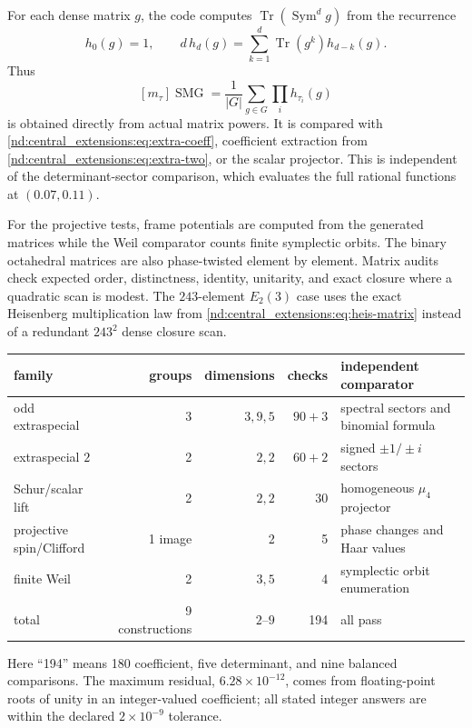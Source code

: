 \documentclass[10pt]{article}
\newcommand{\Sym}{\operatorname{Sym}}
\newcommand{\Tr}{\operatorname{Tr}}
\newcommand{\SMG}{\operatorname{SMG}}
\newcommand{\MGF}{\SMG}
\begin{document}
For each dense matrix $g$, the code computes
$\Tr(\Sym^d g)$ from the recurrence
\begin{equation}\label{nd:central_extensions:eq:newton}
 h_0(g)=1,\qquad
 d\,h_d(g)=\sum_{k=1}^{d}\Tr(g^k)h_{d-k}(g).
\end{equation}
Thus
\[
 [m_\tau]\MGF=\frac1{|G|}\sum_{g\in G}\prod_i h_{\tau_i}(g)
\]
is obtained directly from actual matrix powers.  It is compared with
\eqref{nd:central_extensions:eq:extra-coeff}, coefficient extraction from \eqref{nd:central_extensions:eq:extra-two}, or
the scalar projector.  This is independent of the determinant-sector
comparison, which evaluates the full rational functions at
$(0.07,0.11)$.

For the projective tests, frame potentials are computed from the generated
matrices while the Weil comparator counts finite symplectic orbits.  The
binary octahedral matrices are also phase-twisted element by element.  Matrix
audits check expected order, distinctness, identity, unitarity, and exact
closure where a quadratic scan is modest.  The $243$-element $E_2(3)$ case
uses the exact Heisenberg multiplication law from \eqref{nd:central_extensions:eq:heis-matrix}
instead of a redundant $243^2$ dense closure scan.

\begin{center}
\begin{tabularx}{\linewidth}{@{}l r r r X@{}}
\toprule
family & groups & dimensions & checks & independent comparator\\
\midrule
odd extraspecial & 3 & $3,9,5$ & $90+3$ & spectral sectors and binomial formula\\
extraspecial $2$ & 2 & $2,2$ & $60+2$ & signed $\pm1/\pm i$ sectors\\
Schur/scalar lift & 2 & $2,2$ & 30 & homogeneous $\mu_4$ projector\\
projective spin/Clifford & 1 image & 2 & 5 & phase changes and Haar values\\
finite Weil & 2 & $3,5$ & 4 & symplectic orbit enumeration\\
\midrule
total & 9 constructions & $2$--$9$ & 194 & all pass\\
\bottomrule
\end{tabularx}
\end{center}

Here ``194'' means 180 coefficient, five determinant, and nine balanced
comparisons.  The maximum residual, $6.28\times10^{-12}$, comes from
floating-point roots of unity in an integer-valued coefficient; all stated
integer answers are within the declared $2\times10^{-9}$ tolerance.
\end{document}
